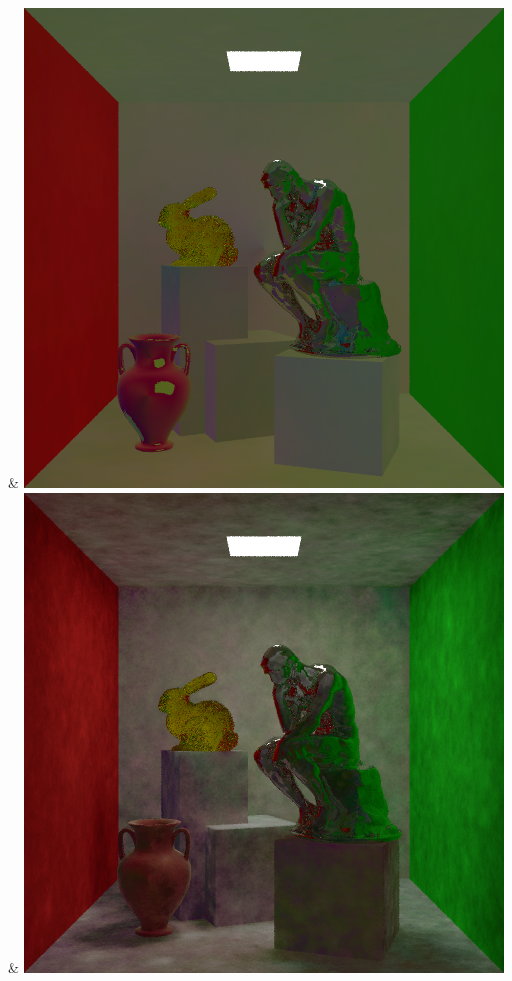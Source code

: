 & \includegraphics[width=\linewidth]{figures/py/tests/batch_size/5+nrc+pt+14@4_1spp.png}
& \includegraphics[width=\linewidth]{figures/py/tests/batch_size/25+nrc+pt+14@4_1spp.png}
